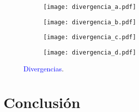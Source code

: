 \documentclass[aps,prb,twocolumn,superscriptaddress,floatfix,longbibliography,10pt]{revtex4-2}
\begin{document}
\onecolumngrid

\begin{figure}
  \centering
  \begin{subfigure}[b]{0.45\textwidth}
      \centering
      \texttt{[image: divergencia\_a.pdf]}
      \caption{\label{fig:divergencia_a}}
  \end{subfigure}
  \hfill
  \begin{subfigure}[b]{0.45\textwidth}
      \centering
      \texttt{[image: divergencia\_b.pdf]}
      \caption{\label{fig:divergencia_b}}
  \end{subfigure}
  \hfill
  \begin{subfigure}[b]{0.45\textwidth}
      \centering
      \texttt{[image: divergencia\_c.pdf]}
      \caption{\label{fig:divergencia_c}}
  \end{subfigure}
  \hfill
  \begin{subfigure}[b]{0.45\textwidth}
      \centering
      \texttt{[image: divergencia\_d.pdf]}
      \caption{\label{fig:divergencia_d}}
  \end{subfigure}
     \caption{\textcolor{blue}{Divergencias}.}
     \label{fig:simple_error_vs_h}
\end{figure}

\twocolumngrid


\section{Conclusión}




\end{document}
